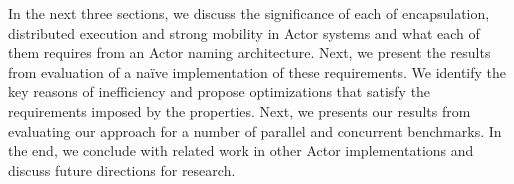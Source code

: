 In the next three sections, we discuss the significance of each of encapsulation, distributed execution and strong mobility in Actor systems and what each of them requires from an Actor naming architecture. Next, we present the results from evaluation of a na\"ive implementation of these requirements. We identify the key reasons of inefficiency and propose optimizations that satisfy the requirements imposed by the properties. Next, we presents our results from evaluating our approach for a number of parallel and concurrent benchmarks. In the end, we conclude with related work in other Actor implementations and discuss future directions for research.
 
